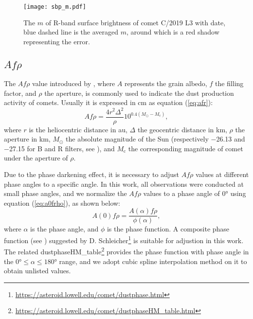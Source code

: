 \begin{figure}
    \centering
    \texttt{[image: sbp\_m.pdf]}
    \caption{The $m$ of R-band surface brightness of comet C/2019 L3 with date, blue dashed line is the averaged $m$, around which is a red shadow representing the error. }
    \label{fig:sbp_m}
\end{figure}


\subsection{$Af\rho$}

The $Af\rho$ value introduced by \citet{ahearn_comet_1984}, where $A$ represents the grain albedo, $f$ the filling factor, and $\rho$ the aperture, is commonly used to indicate the dust production activity of comets. Usually it is expressed in \si{\cm} as equation (\ref{eq:afr}): 
\begin{equation}
    Af\rho = \frac{4 r^2 \Delta^2}{\rho} 10^{0.4(M_\odot - M_\mathrm{c})}, 
    \label{eq:afr}
\end{equation}
where $r$ is the heliocentric distance in \si{\astronomicalunit}, $\Delta$ the geocentric distance in \si{\km}, $\rho$ the aperture in \si{\km}, $M_\odot$ the absolute magnitude of the Sun (respectively \num{-26.13} and \num{-27.15} for B and R filters, see \citealt{willmer_absolute_2018}), and $M_\mathrm{c}$ the corresponding magnitude of comet under the aperture of $\rho$. 

Due to the phase darkening effect, it is necessary to adjust $Af\rho$ values at different phase angles to a specific angle. In this work, all observations were conducted at small phase angles, and we normalize the $Af\rho$ values to a phase angle of \ang{0} using equation (\ref{eq:a0frho}), as shown below:
\begin{equation}
    A(0)f\rho = \frac{A(\alpha)f\rho}{\phi(\alpha)}, \label{eq:a0frho}
\end{equation}
where $\alpha$ is the phase angle, and $\phi$ is the phase function. A composite phase function (see \citealt{schleicher_composition_2011, marcus_forward-scattering_2007}) suggested by D. Schleicher\footnote{\href{https://asteroid.lowell.edu/comet/dustphase.html}{https://asteroid.lowell.edu/comet/dustphase.html}} is suitable for adjustion in this work. The related dustphaseHM\_table\footnote{\href{https://asteroid.lowell.edu/comet/dustphaseHM_table.html}{https://asteroid.lowell.edu/comet/dustphaseHM\_table.html}} provides the phase function with phase angle in the $\ang{0} \leqslant \alpha \leqslant \ang{180}$ range, and we adopt cubic spline interpolation method on it to obtain unlisted values. 

